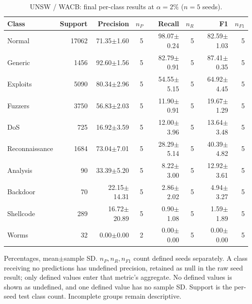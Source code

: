 \begin{table}[t]
\centering\scriptsize
\setlength{\tabcolsep}{3.3pt}
\caption{UNSW / WACB: final per-class results at $\alpha=2\%$ ($n=5$ seeds).}\label{tab:forgetting-class-unsw_nb15-wacb}
\begin{tabular}{lrrrrrrr}
\toprule
Class & Support & Precision & $n_P$ & Recall & $n_R$ & F1 & $n_{F1}$ \\
\midrule
Normal & 17062 & 71.35$\pm$1.60 & 5 & 98.07$\pm$0.24 & 5 & 82.59$\pm$1.03 & 5 \\
Generic & 1456 & 92.60$\pm$1.56 & 5 & 82.79$\pm$0.91 & 5 & 87.41$\pm$0.35 & 5 \\
Exploits & 5090 & 80.34$\pm$2.96 & 5 & 54.55$\pm$5.15 & 5 & 64.92$\pm$4.45 & 5 \\
Fuzzers & 3750 & 56.83$\pm$2.03 & 5 & 11.90$\pm$0.91 & 5 & 19.67$\pm$1.29 & 5 \\
DoS & 725 & 16.92$\pm$3.59 & 5 & 12.00$\pm$3.96 & 5 & 13.64$\pm$3.48 & 5 \\
Reconnaissance & 1684 & 73.04$\pm$7.01 & 5 & 28.29$\pm$5.14 & 5 & 40.39$\pm$4.82 & 5 \\
Analysis & 90 & 33.39$\pm$5.20 & 5 & 8.22$\pm$3.00 & 5 & 12.92$\pm$3.61 & 5 \\
Backdoor & 70 & 22.15$\pm$14.31 & 5 & 2.86$\pm$2.02 & 5 & 4.94$\pm$3.27 & 5 \\
Shellcode & 289 & 16.72$\pm$20.89 & 5 & 0.90$\pm$1.08 & 5 & 1.59$\pm$1.89 & 5 \\
Worms & 32 & 0.00$\pm$0.00 & 2 & 0.00$\pm$0.00 & 5 & 0.00$\pm$0.00 & 5 \\
\bottomrule
\end{tabular}
\par\smallskip\begin{minipage}{0.98\textwidth}\scriptsize Percentages, mean$\pm$sample SD. $n_P,n_R,n_{F1}$ count defined seeds separately. A class receiving no predictions has undefined precision, retained as null in the raw seed result; only defined values enter that metric's aggregate. No defined values is shown as undefined, and one defined value has no sample SD. Support is the per-seed test class count. Incomplete groups remain descriptive.\end{minipage}
\end{table}

